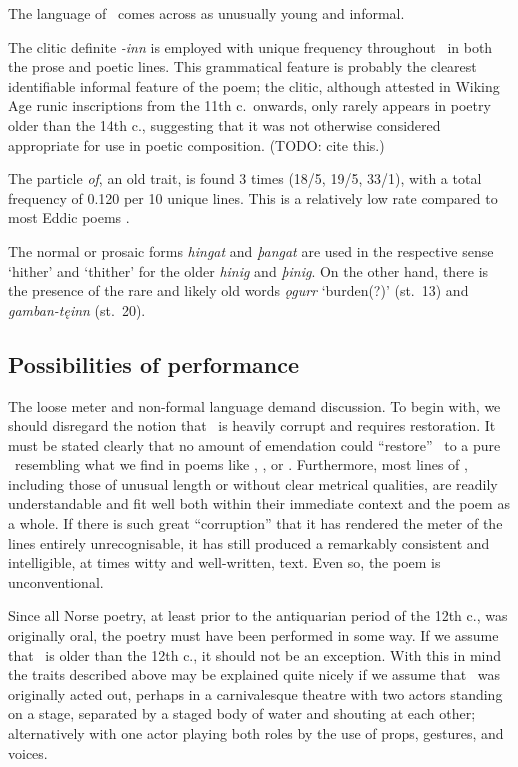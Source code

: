 The language of \Harbardsljod\ comes across as unusually young and informal.

The clitic definite \emph{-inn} is employed with unique frequency throughout \Harbardsljod\ in both the prose and poetic lines.  This grammatical feature is probably the clearest identifiable informal feature of the poem; the clitic, although attested in Wiking Age runic inscriptions from the 11th c.~onwards, only rarely appears in poetry older than the 14th c., suggesting that it was not otherwise considered appropriate for use in poetic composition. (TODO: cite this.)

The particle \emph{of}, an old trait, is found 3 times (18/5, 19/5, 33/1), with a total frequency of 0.120 per 10 unique lines.  This is a relatively low rate compared to most Eddic poems \parencite[70]{Sapp2022}.

The normal or prosaic forms \emph{hingat} and \emph{þangat} are used in the respective sense ‘hither’ and ‘thither’ for the older \emph{hinig} and \emph{þinig}.
On the other hand, there is the presence of the rare and likely old words \emph{ǫgurr} ‘burden(?)’ (st.~13) and \emph{gamban-tęinn} (st.~20).

\subsection{Possibilities of performance}

The loose meter and non-formal language demand discussion.  To begin with, we should disregard the notion that \Harbardsljod\ is heavily corrupt and requires restoration.  It must be stated clearly that no amount of emendation could “restore” \Harbardsljod\ to a pure \Ljodahattr\ resembling what we find in poems like , , or .  Furthermore, most lines of \Harbardsljod, including those of unusual length or without clear metrical qualities, are readily understandable and fit well both within their immediate context and the poem as a whole.  If there is such great “corruption” that it has rendered the meter of the lines entirely unrecognisable, it has still produced a remarkably consistent and intelligible, at times witty and well-written, text.  Even so, the poem is unconventional.

Since all Norse poetry, at least prior to the antiquarian period of the 12th c., was originally oral, the poetry must have been performed in some way.  If we assume that \Harbardsljod\ is older than the 12th c., it should not be an exception.  With this in mind the traits described above may be explained quite nicely if we assume that \Harbardsljod\ was originally acted out, perhaps in a carnivalesque theatre with two actors standing on a stage, separated by a staged body of water and shouting at each other; alternatively with one actor playing both roles by the use of props, gestures, and voices.

